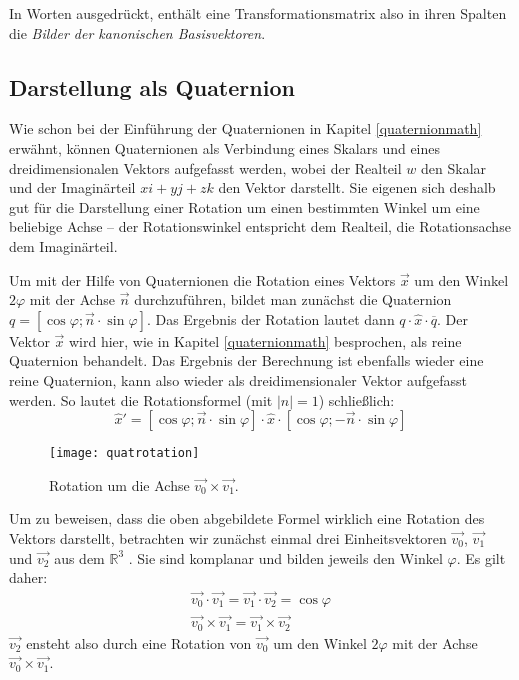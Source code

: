 In Worten ausgedrückt, enthält eine Transformationsmatrix also in ihren Spalten die \emph{Bilder der kanonischen Basisvektoren}.

\subsection{Darstellung als Quaternion}
Wie schon bei der Einführung der Quaternionen in Kapitel \ref{quaternionmath} erwähnt, können Quaternionen als Verbindung eines Skalars und eines dreidimensionalen Vektors aufgefasst werden, wobei der Realteil $w$ den Skalar und der Imaginärteil $xi + yj + zk$ den Vektor  darstellt. Sie eigenen sich deshalb gut für die Darstellung einer Rotation um einen bestimmten Winkel um eine beliebige Achse -- der Rotationswinkel entspricht dem Realteil, die Rotationsachse dem Imaginärteil.

Um mit der Hilfe von Quaternionen die Rotation eines Vektors $\vec x$ um den Winkel $2 \varphi$ mit der Achse $\vec n$ durchzuführen, bildet man zunächst die Quaternion $q = \left[ \cos \varphi; \vec n \cdot \sin \varphi \right]$. Das Ergebnis der Rotation lautet dann $q \cdot \hat{x} \cdot \overline{q}$. Der Vektor $\vec x$ wird hier, wie in Kapitel \ref{quaternionmath} besprochen, als reine Quaternion behandelt. Das Ergebnis der Berechnung ist ebenfalls wieder eine reine Quaternion, kann also wieder als dreidimensionaler Vektor aufgefasst werden. So lautet die Rotationsformel (mit $\left| n \right| = 1$) schließlich:
\begin{equation}
 \hat{x}' = \left[ \cos \varphi; \vec n \cdot \sin \varphi \right] \cdot \hat{x} \cdot \left[ \cos \varphi; -\vec n \cdot \sin \varphi \right]
\end{equation}

\begin{wrapfigure}{R}{0.5\textwidth}
  \vspace{-10pt}
  \texttt{[image: quatrotation]}
  \vspace{-10pt}
  \caption{Rotation um die Achse $\vec{v_0} \times \vec{v_1}$.}
\end{wrapfigure}

Um zu beweisen, dass die oben abgebildete Formel wirklich eine Rotation des Vektors darstellt, betrachten wir zunächst einmal drei Einheitsvektoren $\vec{v_0}$, $\vec{v_1}$ und $\vec{v_2}$ aus dem $\mathbb R^3$ . Sie sind komplanar und bilden jeweils den Winkel $\varphi$. Es gilt daher:
\begin{align}
 \vec{v_0} \cdot \vec{v_1} = \vec{v_1} \cdot \vec{v_2} = \cos \varphi \label{dotsame} \\
 \vec{v_0} \times\vec{v_1} = \vec{v_1} \times \vec{v_2} \label{crosssame}
\end{align}
$\vec{v_2}$ ensteht also durch eine Rotation von $\vec{v_0}$ um den Winkel $2 \varphi$ mit der Achse $\vec{v_0} \times \vec{v_1}$.

